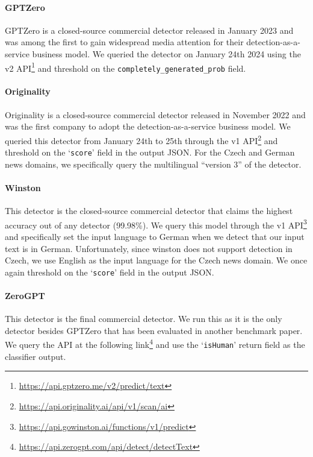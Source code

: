\documentclass[11pt]{article}
\begin{document}
\paragraph{GPTZero} \cite{tian2023gptzero} GPTZero is a closed-source commercial detector released in January 2023 and was among the first to gain widespread media attention for their detection-as-a-service business model. We queried the detector on January 24th 2024 using the v2 API\footnote{\url{https://api.gptzero.me/v2/predict/text}} and threshold on the \texttt{completely\_generated\_prob} field.

\paragraph{Originality} Originality is a closed-source commercial detector released in November 2022 and was the first company to adopt the detection-as-a-service business model. We queried this detector from January 24th to 25th through the v1 API\footnote{\url{https://api.originality.ai/api/v1/scan/ai}} and threshold on the `\texttt{score}' field in the output JSON. For the Czech and German news domains, we specifically query the multilingual ``version 3'' of the detector.

\paragraph{Winston} This detector is the closed-source commercial detector that claims the highest accuracy out of any detector (99.98\%). We query this model through the v1 API\footnote{\url{https://api.gowinston.ai/functions/v1/predict}} and specifically set the input language to German when we detect that our input text is in German. Unfortunately, since winston does not support detection in Czech, we use English as the input language for the Czech news domain. We once again 
threshold on the `\texttt{score}' field in the output JSON.

\paragraph{ZeroGPT} This detector is the final commercial detector. We run this as it is the only detector besides GPTZero that has been evaluated in another benchmark paper. We query the API at the following link\footnote{\url{https://api.zerogpt.com/api/detect/detectText}} and use the `\texttt{isHuman}' return field as the classifier output.
\end{document}
